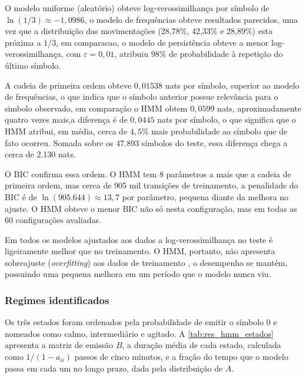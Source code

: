 \documentclass[
    12pt,                %
    openright,           %
    oneside,             %
    a4paper,             %
    english,             %
    brazil               %
]{abntex2}
\begin{document}
O modelo uniforme (aleatório) obteve log-verossimilhança por símbolo de $\ln(1/3) \approx -1{,}0986$,
o modelo de frequências obteve resultados parecidos, uma vez que a distribuição das movimentações (28,78\%, 42,33\% e 28,89\%) esta próxima a $1/3$, em comparacao, 
o modelo de persistência obteve a menor log-verossimilhança, com $\varepsilon = 0{,}01$, atribuiu $98\%$ de probabilidade à repetição do último símbolo.

A cadeia de primeira ordem obteve $0{,}01538$ nats por símbolo, superior ao modelo de frequências, o que indica que o símbolo anterior possue relevância para o simbolo observado, em comparação
o HMM obtem $0{,}0599$ nats, aproximadamente quatro vezes mais,a diferença é de $0{,}0445$ nats por símbolo, o que significa que o HMM atribui,
em média, cerca de $4{,}5\%$ mais probabilidade ao símbolo que de fato ocorreu. Somada sobre os 47.893 símbolos do teste, essa diferença chega a cerca de 2.130 nats.

O BIC confirma essa ordem. O HMM tem 8 parâmetros a mais que a cadeia de primeira ordem, mas cerca de 905 mil transições de treinamento, a penalidade do 
BIC \cite{RAFTERY1985} é de $\ln(905.644) \approx 13{,}7$ por parâmetro, pequena diante da melhora no ajuste. O HMM obteve o menor BIC não só nesta configuração, mas em todas as 
60 configurações avaliadas.

Em todos os modelos ajustados aos dados a log-verossimilhança no teste é ligeiramente melhor que no treinamento. 
O HMM, portanto, não apresenta sobreajuste (\textit{overfitting}) aos dados de treinamento \cite{JAMES2021}, o desempenho se mantém, 
possuindo uma pequena melhora em um período que o modelo nunca viu. 

\subsubsection{Regimes identificados}
\label{sec:res_hmm_regimes}

Os três estados foram ordenados pela probabilidade de emitir o símbolo $0$ e nomeados como calmo, intermediário e agitado. 
A \autoref{tab:res_hmm_estados} apresenta a matriz de emissão $B$, a duração média de cada estado, calculada como $1/(1 - a_{ii})$ \cite{Rabiner1989}
passos de cinco minutos, e a fração do tempo que o modelo passa em cada um no longo prazo, dada pela distribuição de $A$.
\end{document}
